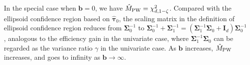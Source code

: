 \documentclass[11pt]{article}
\newcommand{\htau}{\widehat\tau}
\numberwithin{equation}{section}
\theoremstyle{definition}
\newtheorem{remark}{Remark}[section]
\begin{document}
In the special case when $\bm{b}=0$, we have $\hat{M}_{\rm PW} = \chi^2_{d, 1-\zeta}$. Compared with the ellipsoid confidence region based on $\bm{\htau}_0$, the scaling matrix in the definition of ellipsoid confidence region reduces from $\bm{\Sigma}_0^{-1}$ to $\bm{\Sigma}_0^{-1} + \bm{\Sigma}_1^{-1} = (\bm{\Sigma}_1^{-1} \bm{\Sigma}_0 + \bm{I}_d)\bm{\Sigma}_0^{-1}$, analogous to the efficiency gain in the univariate case, where $\bm{\Sigma}_1^{-1} \bm{\Sigma}_0$ can be regarded as the variance ratio $\gamma$ in the univariate case. As $\bm{b}$ increases, $\hat{M}_{\rm PW}$ increases, and goes to infinity as $\bm{b} \to \infty$.

\end{document}
